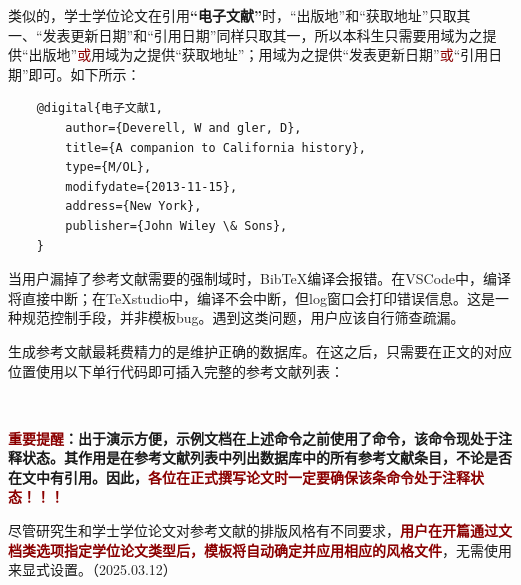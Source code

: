 \documentclass[doctor, vlined, ]{DissertUESTC}
\begin{document}
	类似的，学士学位论文在引用\textbf{“电子文献”}时，“出版地”和“获取地址”只取其一、“发表更新日期”和“引用日期”同样只取其一，所以本科生只需要用域为之提供“出版地”\textcolor{DarkRed}{或}用域为之提供“获取地址”；用域为之提供“发表更新日期”\textcolor{DarkRed}{或}“引用日期”即可。如下所示：
	\begin{verbatim}
	@digital{电子文献1,
	    author={Deverell, W and gler, D},
	    title={A companion to California history},
	    type={M/OL},
	    modifydate={2013-11-15},
	    address={New York},
	    publisher={John Wiley \& Sons},
	}
	\end{verbatim}

	

	当用户漏掉了参考文献需要的强制域时，BibTeX编译会报错。在VSCode中，编译将直接中断；在TeXstudio中，编译不会中断，但log窗口会打印错误信息。这是一种规范控制手段，并非模板bug。遇到这类问题，用户应该自行筛查疏漏。
	
	生成参考文献最耗费精力的是维护正确的数据库。在这之后，只需要在正文的对应位置使用以下单行代码即可插入完整的参考文献列表：
	\begin{verbatim}
		
	\end{verbatim}
	
	\textbf{\textcolor{DarkRed}{重要提醒}：出于演示方便，示例文档在上述命令之前使用了命令，该命令现处于注释状态。其作用是在参考文献列表中列出数据库中的所有参考文献条目，不论是否在文中有引用。因此，\textcolor{DarkRed}{各位在正式撰写论文时一定要确保该条命令处于注释状态！！！}}
	
	尽管研究生和学士学位论文对参考文献的排版风格有不同要求，\textbf{\textcolor{DarkRed}{用户在开篇通过文档类选项指定学位论文类型后，模板将自动确定并应用相应的风格文件}}，无需使用来显式设置。（2025.03.12）
	
\end{document}
